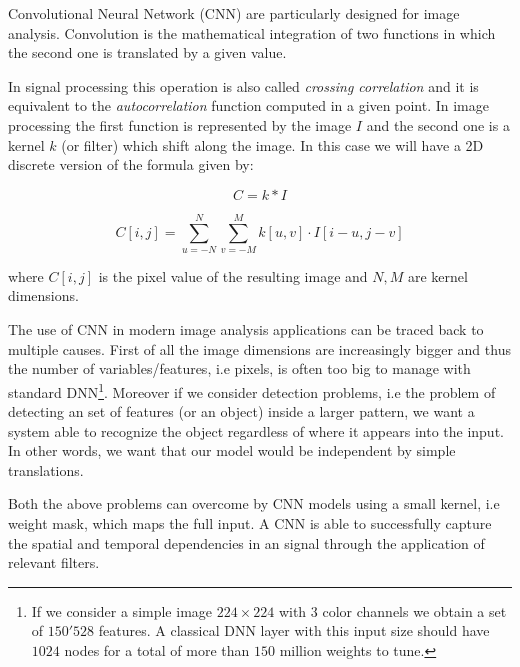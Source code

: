 



Convolutional Neural Network (CNN) are particularly designed for image analysis.
Convolution is the mathematical integration of two functions in which the second one is translated by a given value.

In signal processing this operation is also called \emph{crossing correlation} and it is equivalent to the \emph{autocorrelation} function computed in a given point.
In image processing the first function is represented by the image $I$ and the second one is a kernel $k$ (or filter) which shift along the image.
In this case we will have a 2D discrete version of the formula given by:

$$
C = k * I
$$

$$
C[i, j] = \sum_{u=-N}^{N} \sum_{v=-M}^{M} k[u, v] \cdot I[i - u, j - v]
$$

where $C[i, j]$ is the pixel value of the resulting image and $N, M$ are kernel dimensions.

The use of CNN in modern image analysis applications can be traced back to multiple causes.
First of all the image dimensions are increasingly bigger and thus the number of variables/features, i.e pixels, is often too big to manage with standard DNN\footnote{
  If we consider a simple image $224\times224$ with $3$ color channels we obtain a set of $150'528$ features.
  A classical DNN layer with this input size should have $1024$ nodes for a total of more than $150$ million weights to tune.
}.
Moreover if we consider detection problems, i.e the problem of detecting an set of features (or an object) inside a larger pattern, we want a system able to recognize the object regardless of where it appears into the input.
In other words, we want that our model would be independent by simple translations.

Both the above problems can overcome by CNN models using a small kernel, i.e weight mask, which maps the full input.
A CNN is able to successfully capture the spatial and temporal dependencies in an signal through the application of relevant filters.






